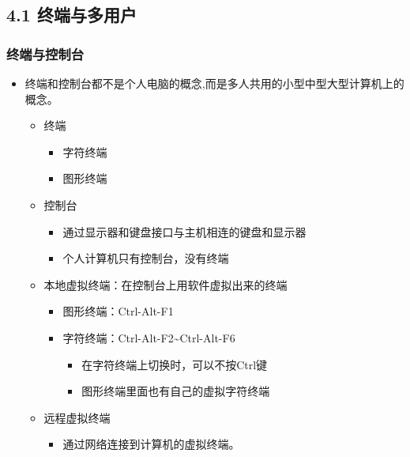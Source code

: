\documentclass[xcolor=svgnames,presentation]{beamer}
\begin{document}
\subsection{4.1 终端与多用户}
\label{sec-4-1}
\begin{frame}
\frametitle{终端与控制台}
\label{sec-4-1-1}
\begin{itemize}

\item 终端和控制台都不是个人电脑的概念,而是多人共用的小型中型大型计算机上的概念。
\label{sec-4-1-1-1}%
\begin{itemize}

\item 终端
\label{sec-4-1-1-1-1}%
\begin{itemize}

\item 字符终端
\label{sec-4-1-1-1-1-1}%

\item 图形终端
\label{sec-4-1-1-1-1-2}%
\end{itemize} %

\item 控制台
\label{sec-4-1-1-1-2}%
\begin{itemize}

\item 通过显示器和键盘接口与主机相连的键盘和显示器
\label{sec-4-1-1-1-2-1}%

\item 个人计算机只有控制台，没有终端
\label{sec-4-1-1-1-2-2}%
\end{itemize} %

\item 本地虚拟终端：在控制台上用软件虚拟出来的终端
\label{sec-4-1-1-1-3}%
\begin{itemize}

\item 图形终端：Ctrl-Alt-F1
\label{sec-4-1-1-1-3-1}%

\item 字符终端：Ctrl-Alt-F2\~{}Ctrl-Alt-F6
\label{sec-4-1-1-1-3-2}%
\begin{itemize}

\item 在字符终端上切换时，可以不按Ctrl键
\label{sec-4-1-1-1-3-2-1}%

\item 图形终端里面也有自己的虚拟字符终端
\label{sec-4-1-1-1-3-2-2}%
\end{itemize} %
\end{itemize} %

\item 远程虚拟终端
\label{sec-4-1-1-1-4}%
\begin{itemize}

\item 通过网络连接到计算机的虚拟终端。
\label{sec-4-1-1-1-4-1}%
\end{itemize} %
\end{itemize} %
\end{itemize} %
\end{frame}
\end{document}
